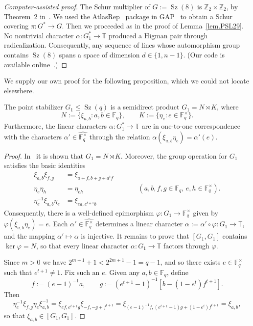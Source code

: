 \begin{proof}[Computer-assisted proof]
The Schur multiplier of $G := \operatorname{Sz}(8)$ is $\mathbb{Z}_2 \times \mathbb{Z}_2$, by Theorem~2 in~\cite{AlperinGorenstein:66}.
We used the AtlasRep~\cite{AtlasRep} package in GAP~\cite{GAP} to obtain a Schur covering $\pi \colon G^* \to G$.
Then we proceeded as in the proof of Lemma~\ref{lem.PSL29}.
No nontrivial character $\alpha \colon G_1^* \to \mathbb{T}$ produced a Higman pair through radicalization.
Consequently, any sequence of lines whose automorphism group contains $\operatorname{Sz}(8)$ spans a space of dimension $d \in \{1,n-1\}$.
(Our code is available online~\cite{github}.)
\end{proof}

We supply our own proof for the following proposition, which we could not locate elsewhere.

\begin{proposition}
\label{prop:Szstab}
The point stabilizer $G_1 \leq \operatorname{Sz}(q)$ is a semidirect product $G_1 = N \rtimes K$, where 
\[ N := \{ \xi_{a,b} : a,b \in \mathbb{F}_q \}, \qquad K := \{ \eta_e : e \in \mathbb{F}_q^\times \}. \]
Furthermore, the linear characters $\alpha\colon G_1^* \to \mathbb{T}$ are in one-to-one correspondence with the characters $\alpha'\in\widehat{\mathbb{F}_{q}^\times}$ through the relation $\alpha(\xi_{a,b} \eta_e )=\alpha'(e)$.
\end{proposition}

\begin{proof}
In~\cite[Lemma~XI.3.1]{HuppertB:82:III} it is shown that $G_1 = N \rtimes K$.
Moreover, the group operation for $G_1$ satisfies the basic identities
\begin{align*}
\xi_{a,b} \xi_{f,g} &= \xi_{a+f, b + g + a^t f} \\
\eta_e \eta_h &= \eta_{eh} \qquad \qquad \qquad \qquad (a,b,f,g \in \mathbb{F}_q,\, e, h \in \mathbb{F}_q^\times). \\
\eta_e^{-1} \xi_{a,b} \eta_e &= \xi_{ea, e^{t + 1} b}
\end{align*}
Consequently, there is a well-defined epimorphism $\varphi \colon G_1 \to \mathbb{F}_q^\times$ given by $\varphi(\xi_{a,b} \eta_e) = e$.
Each $\alpha' \in \widehat{ \mathbb{F}_q^\times }$ determines a linear character $\alpha := \alpha' \circ \varphi \colon G_1 \to \mathbb{T}$, and the mapping $\alpha' \mapsto \alpha$ is injective.
It remains to prove that $[G_1,G_1]$ contains $\ker \varphi = N$, so that every linear character $\alpha \colon G_1 \to \mathbb{T}$ factors through $\varphi$.

Since $m > 0$ we have $2^{m+1}+1 < 2^{2m+1} - 1 = q-1$, and so there exists $e \in \mathbb{F}_q^\times$ such that $e^{t+1} \neq 1$.
Fix such an $e$.
Given any $a,b \in \mathbb{F}_q$, define 
\[
f := (e-1)^{-1}a,
\qquad
g := (e^{t + 1} - 1)^{-1}[b-(1-e^t)f^{t+1}].
\]
Then
\[
\eta_{e}^{-1} \xi_{f,g} \eta_e \xi_{a,b}^{-1}
=
\xi_{ef, e^{t + 1} g} \xi_{-f,-g+f^{t+1}}
=
\xi_{ (e-1)^{-1} f, (e^{t+1}-1)g+(1-e^t)f^{t+1}}
=
\xi_{a,b},
\]
so that $\xi_{a,b} \in [G_1,G_1]$.
\end{proof}

